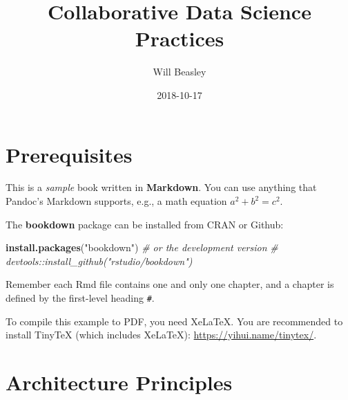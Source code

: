 \documentclass[]{book}
\title{Collaborative Data Science Practices}
\author{Will Beasley}
\date{2018-10-17}
\newenvironment{Shaded}{\begin{snugshade}}{\end{snugshade}}
\newcommand{\CommentTok}[1]{\textcolor[rgb]{0.56,0.35,0.01}{\textit{#1}}}
\newcommand{\KeywordTok}[1]{\textcolor[rgb]{0.13,0.29,0.53}{\textbf{#1}}}
\newcommand{\NormalTok}[1]{#1}
\newcommand{\StringTok}[1]{\textcolor[rgb]{0.31,0.60,0.02}{#1}}
\theoremstyle{definition}
\theoremstyle{definition}
\theoremstyle{definition}
\theoremstyle{remark}
\begin{document}
\maketitle

{
\setcounter{tocdepth}{1}
\tableofcontents
}
\hypertarget{prerequisites}{%
\chapter{Prerequisites}\label{prerequisites}}

This is a \emph{sample} book written in \textbf{Markdown}. You can use
anything that Pandoc's Markdown supports, e.g., a math equation
\(a^2 + b^2 = c^2\).

The \textbf{bookdown} package can be installed from CRAN or Github:

\begin{Shaded}
\begin{Highlighting}[]
\KeywordTok{install.packages}\NormalTok{(}\StringTok{"bookdown"}\NormalTok{)}
\CommentTok{# or the development version}
\CommentTok{# devtools::install_github("rstudio/bookdown")}
\end{Highlighting}
\end{Shaded}

Remember each Rmd file contains one and only one chapter, and a chapter
is defined by the first-level heading \texttt{\#}.

To compile this example to PDF, you need XeLaTeX. You are recommended to
install TinyTeX (which includes XeLaTeX):
\url{https://yihui.name/tinytex/}.

\hypertarget{architecture-principles}{%
\chapter{Architecture Principles}\label{architecture-principles}}
\end{document}
